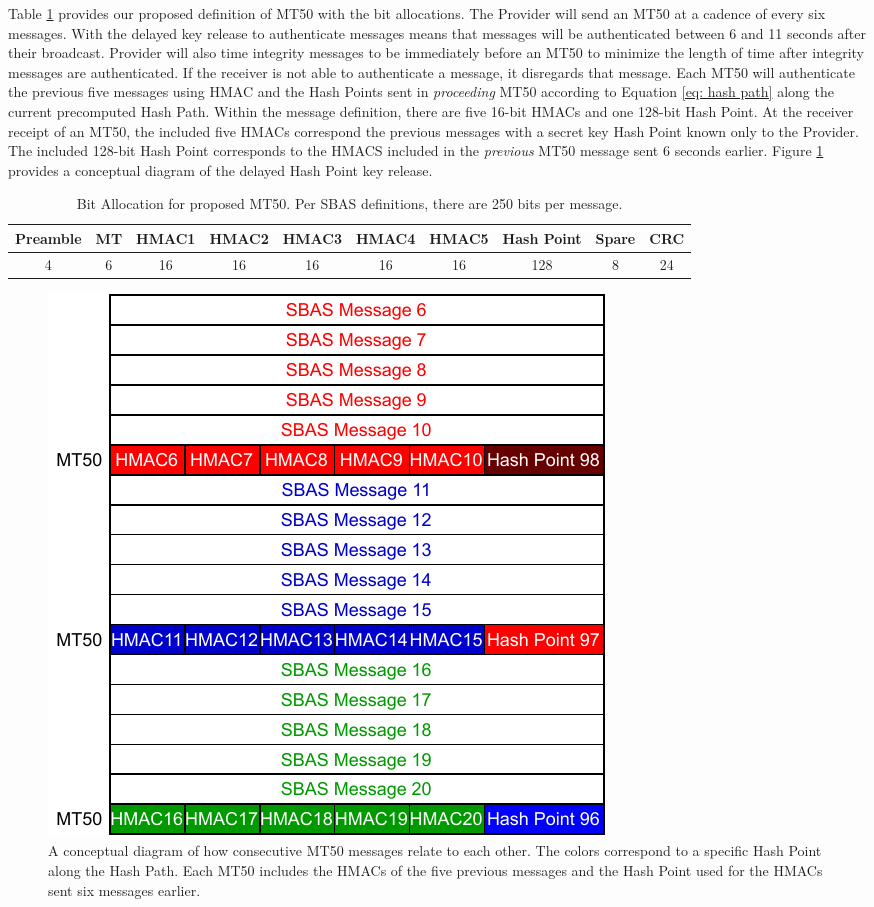 \documentclass[letterpaper,times]{IONconf/IONconf}
\begin{document}
Table \ref{tab: littlemac} provides our proposed definition of MT50 with the bit allocations.
The Provider will send an MT50 at a cadence of every six messages.
With the delayed key release to authenticate messages means that messages will be authenticated between 6 and 11 seconds after their broadcast.
Provider will also time integrity messages to be immediately before an MT50 to minimize the length of time after integrity messages are authenticated.
If the receiver is not able to authenticate a message, it disregards that message.
Each MT50 will authenticate the previous five messages using HMAC and the Hash Points sent in {\em proceeding} MT50 according to Equation \eqref{eq: hash path} along the current precomputed Hash Path.
Within the message definition, there are five 16-bit HMACs and one 128-bit Hash Point.
At the receiver receipt of an MT50, the included five HMACs correspond the previous messages with a secret key Hash Point known only to the Provider.
The included 128-bit Hash Point corresponds to the HMACS included in the {\em previous} MT50 message sent 6 seconds earlier.
Figure \ref{fig: MT50 Schedule} provides a conceptual diagram of the delayed Hash Point key release.

\begin{table}[H]
\center
\begin{tabular}{|c|c|c|c|c|c|c|c|c|c|} \hline
	Preamble & MT & HMAC1 & HMAC2 & HMAC3 & HMAC4 & HMAC5 & Hash Point & Spare & CRC \\ \hline
	4 & 6 & 16 & 16 & 16 & 16 & 16 & 128 & 8 & 24 \\ \hline
\end{tabular}
\caption{Bit Allocation for proposed MT50. Per SBAS definitions, there are 250 bits per message.}
\label{tab: littlemac}
\end{table}{}

\begin{figure}
\centering
\includegraphics[width=0.5\linewidth]{fig/MT50Schedule.pdf}
\caption{A conceptual diagram of how consecutive MT50 messages relate to each other. The colors correspond to a specific Hash Point along the Hash Path. Each MT50 includes the HMACs of the five previous messages and the Hash Point used for the HMACs sent six messages earlier.}
\label{fig: MT50 Schedule}
\end{figure}
\end{document}
